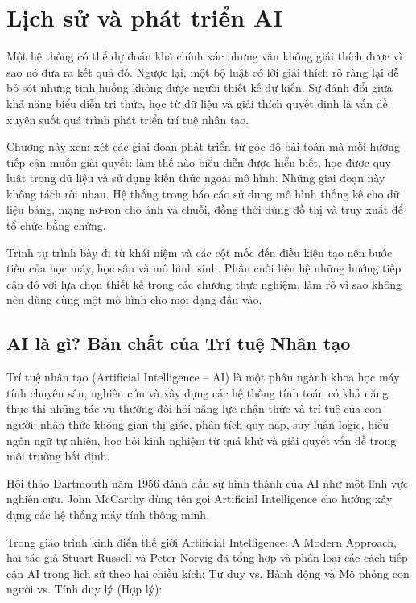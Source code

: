 \chapter{Lịch sử và phát triển AI}\label{chux1b0ux1a1ng-1.-lux1ecbch-sux1eed-vuxe0-phuxe1t-triux1ec3n-ai}

Một hệ thống có thể dự đoán khá chính xác nhưng vẫn không giải thích
được vì sao nó đưa ra kết quả đó. Ngược lại, một bộ luật có lời giải
thích rõ ràng lại dễ bỏ sót những tình huống không được người thiết kế
dự kiến. Sự đánh đổi giữa khả năng biểu diễn tri thức, học từ dữ liệu và
giải thích quyết định là vấn đề xuyên suốt quá trình phát triển trí tuệ
nhân tạo.

Chương này xem xét các giai đoạn phát triển từ góc độ bài toán mà mỗi
hướng tiếp cận muốn giải quyết: làm thế nào biểu diễn được hiểu biết,
học được quy luật trong dữ liệu và sử dụng kiến thức ngoài mô hình.
Những giai đoạn này không tách rời nhau. Hệ thống trong báo cáo sử dụng
mô hình thống kê cho dữ liệu bảng, mạng nơ-ron cho ảnh và chuỗi, đồng
thời dùng đồ thị và truy xuất để tổ chức bằng chứng.

Trình tự trình bày đi từ khái niệm và các cột mốc đến điều kiện tạo nên
bước tiến của học máy, học sâu và mô hình sinh. Phần cuối liên hệ những
hướng tiếp cận đó với lựa chọn thiết kế trong các chương thực nghiệm,
làm rõ vì sao không nên dùng cùng một mô hình cho mọi dạng đầu vào.

\section{AI là gì? Bản chất của Trí tuệ Nhân tạo}\label{ai-luxe0-guxec-bux1ea3n-chux1ea5t-cux1ee7a-truxed-tuux1ec7-nhuxe2n-tux1ea1o}

Trí tuệ nhân tạo (Artificial Intelligence -- AI) là một phân ngành khoa
học máy tính chuyên sâu, nghiên cứu và xây dựng các hệ thống tính toán
có khả năng thực thi những tác vụ thường đòi hỏi năng lực nhận thức và
trí tuệ của con người: nhận thức không gian thị giác, phân tích quy nạp,
suy luận logic, hiểu ngôn ngữ tự nhiên, học hỏi kinh nghiệm từ quá khứ
và giải quyết vấn đề trong môi trường bất định.

Hội thảo Dartmouth năm 1956 đánh dấu sự hình thành của AI như một lĩnh
vực nghiên cứu. John McCarthy dùng tên gọi Artificial Intelligence cho
hướng xây dựng các hệ thống máy tính thông minh.

Trong giáo trình kinh điển thế giới Artificial Intelligence: A Modern
Approach, hai tác giả Stuart Russell và Peter Norvig đã tổng hợp và phân
loại các cách tiếp cận AI trong lịch sử theo hai chiều kích: Tư duy vs.
Hành động và Mô phỏng con người vs. Tính duy lý (Hợp lý):

